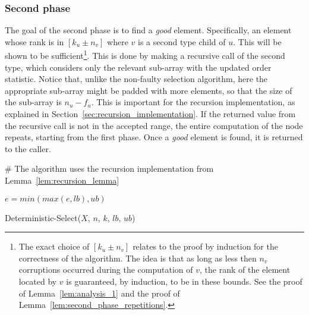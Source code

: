 \documentclass{llncs}
\begin{document}
\subsubsection{Second phase}

The goal of the second phase is to find a \emph{good} element. Specifically, an element whose rank is in $[k_u \pm n_v]$ where $v$ is a second type child of $u$. This will be shown to be sufficient\footnote{The exact choice of $[k_u \pm n_v]$ relates to the proof by induction for the correctness of the algorithm. The idea is that as long as less then $n_v$ corruptions occurred during the computation of $v$, the rank of the element located by $v$ is guaranteed, by induction, to be in these bounds. See the proof of Lemma~\ref{lem:analysis_1} and the proof of Lemma~\ref{lem:second_phase_repetitions}.}. This is done by making a recursive call of the second type, which considers only the relevant sub-array with the updated order statistic. Notice that, unlike the non-faulty selection algorithm, here the appropriate sub-array might be padded with more elements, so that the size of the sub-array is $n_u-f_u$. This is important for the recursion implementation, as explained in Section~\ref{sec:recursion_implementation}. If the returned value from the recursive call is not in the accepted range, the entire computation of the node repeats, starting from the first phase. Once a \emph{good} element is found, it is returned to the caller.

\newpage








\vspace{10mm}

\begin{algorithm}[H]


\# The algorithm uses the recursion implementation from Lemma~\ref{lem:recursion_lemma} \;

\Return $e = min(max(e, lb), ub)$\;

\caption{Deterministic-Select($X$, $n$, $k$, $lb$, $ub$)}
\end{algorithm}
\end{document}
